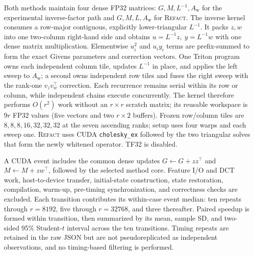 \documentclass[11pt]{article}
\newcommand{\refact}{\textsc{Refact}}
\newcommand{\Aw}{A_{\mathrm w}}
\begin{document}
Both methods maintain four dense FP32 matrices:
\(G,M,L^{-1},\Aw\) for the experimental inverse-factor path and
\(G,M,L,\Aw\) for \refact{}.  The inverse kernel consumes a row-major
contiguous, explicitly lower-triangular \(L^{-1}\).  It packs \(z,w\) into
one two-column right-hand side and obtains
\(u=L^{-1}z,\ y=L^{-1}w\) with one dense matrix multiplication.
Elementwise \(u_i^2\) and \(u_i y_i\) terms are prefix-summed to form the
exact Givens parameters and correction vectors.  One Triton program owns
each independent column tile, updates \(L^{-1}\) in place, and applies the
left sweep to \(\Aw\); a second owns independent row tiles and fuses the
right sweep with the rank-one \(v_zv_w^\top\) correction.  Each recurrence
remains serial within its row or column, while independent chains execute
concurrently.  The kernel therefore performs \(O(r^2)\) work without an
\(r\times r\) scratch matrix; its reusable workspace is \(9r\) FP32 values
(five vectors and two \(r\times2\) buffers).  Frozen row/column tiles are
\(8,8,8,16,32,32,32\) at the seven ascending ranks; setup uses four warps
and each sweep one.  \refact{} uses CUDA \texttt{cholesky\_ex} followed by
the two triangular solves that form the newly whitened operator.  TF32 is
disabled.

A CUDA event includes the common dense updates
\(G\leftarrow G+zz^\top\) and \(M\leftarrow M+zw^\top\), followed by the
selected method core.  Feature I/O and DCT work, host-to-device transfer,
initial-state construction, state restoration, compilation, warm-up,
pre-timing synchronization, and correctness checks are excluded.  Each
transition contributes its within-case event median: ten repeats through
\(r=8192\), five through \(r=32768\), and three thereafter.  Paired speedup
is formed within transition, then summarized by its mean, sample SD, and
two-sided 95\% Student-\(t\) interval across the ten transitions.  Timing
repeats are retained in the raw JSON but are not pseudoreplicated as
independent observations, and no timing-based filtering is performed.
\end{document}
